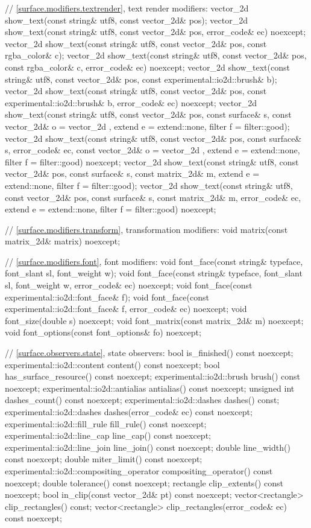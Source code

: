 \begin{codeblock}
{{{{{    // \ref{surface.modifiers.textrender}, text render modifiers:
    vector_2d show_text(const string& utf8, const vector_2d& pos);
    vector_2d show_text(const string& utf8, const vector_2d& pos,
      error_code& ec) noexcept;
    vector_2d show_text(const string& utf8, const vector_2d& pos,
      const rgba_color& c);
    vector_2d show_text(const string& utf8, const vector_2d& pos,
      const rgba_color& c, error_code& ec) noexcept;
    vector_2d show_text(const string& utf8, const vector_2d& pos,
      const experimental::io2d::brush& b);
    vector_2d show_text(const string& utf8, const vector_2d& pos,
      const experimental::io2d::brush& b, error_code& ec) noexcept;
    vector_2d show_text(const string& utf8, const vector_2d& pos,
      const surface& s, const vector_2d& o = vector_2d{ },
      extend e = extend::none, filter f = filter::good);
    vector_2d show_text(const string& utf8, const vector_2d& pos,
      const surface& s, error_code& ec, const vector_2d& o = vector_2d{ },
      extend e = extend::none, filter f = filter::good) noexcept;
    vector_2d show_text(const string& utf8, const vector_2d& pos,
      const surface& s, const matrix_2d& m, extend e = extend::none,
      filter f = filter::good);
    vector_2d show_text(const string& utf8, const vector_2d& pos,
      const surface& s, const matrix_2d& m, error_code& ec,
      extend e = extend::none, filter f = filter::good) noexcept;
    
    // \ref{surface.modifiers.transform}, transformation modifiers:
    void matrix(const matrix_2d& matrix) noexcept;
    
    // \ref{surface.modifiers.font}, font modifiers:
    void font_face(const string& typeface, font_slant sl, font_weight w);
    void font_face(const string& typeface, font_slant sl, font_weight w,
      error_code& ec) noexcept;
    void font_face(const experimental::io2d::font_face& f);
    void font_face(const experimental::io2d::font_face& f, error_code& ec)
      noexcept;
    void font_size(double s) noexcept;
    void font_matrix(const matrix_2d& m) noexcept;
    void font_options(const font_options& fo) noexcept;
    
    // \ref{surface.observers.state}, state observers:
    bool is_finished() const noexcept;
    experimental::io2d::content content() const noexcept;
    bool has_surface_resource() const noexcept;
    experimental::io2d::brush brush() const noexcept;
    experimental::io2d::antialias antialias() const noexcept;
    unsigned int dashes_count() const noexcept;
    experimental::io2d::dashes dashes() const;
    experimental::io2d::dashes dashes(error_code& ec) const noexcept;
    experimental::io2d::fill_rule fill_rule() const noexcept;
    experimental::io2d::line_cap line_cap() const noexcept;
    experimental::io2d::line_join line_join() const noexcept;
    double line_width() const noexcept;
    double miter_limit() const noexcept;
    experimental::io2d::compositing_operator compositing_operator() const
      noexcept;
    double tolerance() const noexcept;
    rectangle clip_extents() const noexcept;
    bool in_clip(const vector_2d& pt) const noexcept;
    vector<rectangle> clip_rectangles() const;
    vector<rectangle> clip_rectangles(error_code& ec) const noexcept;
    
}}}}}
\end{codeblock}
